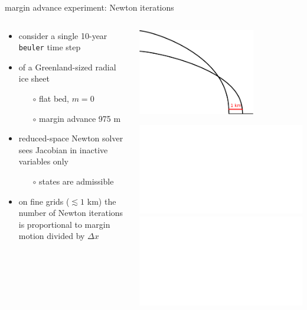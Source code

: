 \documentclass[hide notes,intlimits,usenames,dvipsnames]{beamer}
\begin{document}
\begin{frame}{margin advance experiment: Newton iterations}

\begin{columns}
\begin{column}{0.45\textwidth}
\begin{itemize}
\item consider a single 10-year \texttt{beuler} time step
\item of a Greenland-sized radial ice sheet
    \begin{itemize}
    \item[$\circ$] flat bed, $m=0$
    \item[$\circ$] margin advance 975 m
    \end{itemize}
\item reduced-space Newton solver sees Jacobian in inactive variables only
    \begin{itemize}
    \item[$\circ$] states are admissible
    \end{itemize}
\item<2> on fine grids ($\lesssim 1$ km) the number of Newton iterations is proportional to margin motion divided by $\Delta x$
\end{itemize}\end{column}
\begin{column}{0.55\textwidth}

\bigskip
\hfill \includegraphics[width=0.7\textwidth]{halfarcartoon.pdf}

\bigskip
\includegraphics<1>[width=\textwidth]{newtoniters.pdf}
\includegraphics<2>[width=\textwidth]{newtonitersFIT.pdf}
\end{column}
\end{columns}
\end{frame}
\end{document}
